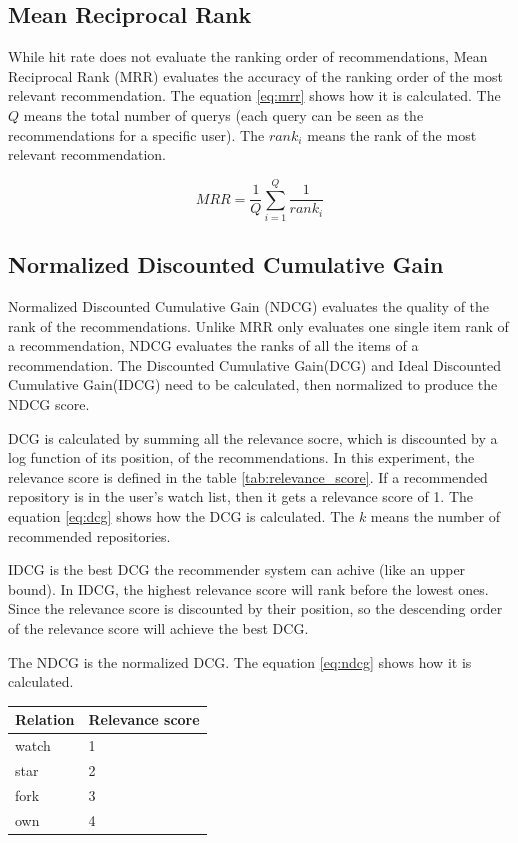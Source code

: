 \documentclass[11pt,twoside]{report}
\begin{document}
\subsection{Mean Reciprocal Rank}
While hit rate does not evaluate the ranking order of recommendations, Mean Reciprocal Rank (MRR) evaluates the accuracy of the ranking order of the most relevant recommendation. The equation \ref{eq:mrr} shows how it is calculated. The $Q$ means the total number of querys (each query can be seen as the recommendations for a specific user). The $rank_i$ means the rank of the most relevant recommendation.

\begin{equation}
    MRR=\frac{1}{Q}\sum_{i=1}^Q\frac{1}{rank_i}
    \label{eq:mrr}
\end{equation}

\subsection{Normalized Discounted Cumulative Gain}
Normalized Discounted Cumulative Gain (NDCG) evaluates the quality of the rank of the recommendations. Unlike MRR only evaluates one single item rank of a recommendation, NDCG evaluates the ranks of all the items of a recommendation. The Discounted Cumulative Gain(DCG) and Ideal Discounted Cumulative Gain(IDCG) need to be calculated, then normalized to produce the NDCG score. 

DCG is calculated by summing all the relevance socre, which is discounted by a log function of its position, of the recommendations. In this experiment, the relevance score is defined in the table \ref{tab:relevance_score}. If a recommended repository is in the user's watch list, then it gets a relevance score of 1. The equation \ref{eq:dcg} shows how the DCG is calculated. The $k$ means the number of recommended repositories.

IDCG is the best DCG the recommender system can achive (like an upper bound). In IDCG, the highest relevance score will rank before the lowest ones. Since the relevance score is discounted by their position, so the descending order of the relevance score will achieve the best DCG.

The NDCG is the normalized DCG. The equation \ref{eq:ndcg} shows how it is calculated.

\begin{center}
    \begin{tabular}{l | l}
    \hline
    Relation & Relevance score \\
    \hline
    watch & 1 \\
    star & 2 \\
    fork & 3 \\
    own & 4
    \end{tabular}
    \label{tab:relevance_score}
\end{center}
\end{document}
